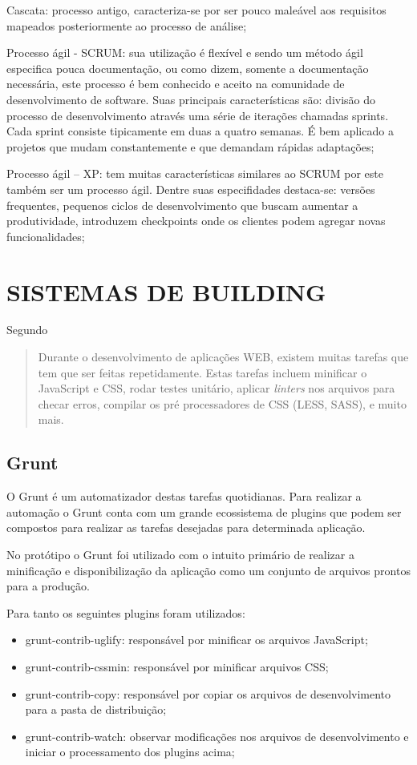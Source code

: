Cascata: processo antigo, caracteriza-se por ser pouco maleável aos
requisitos mapeados posteriormente ao processo de análise;

Processo ágil - SCRUM: sua utilização é flexível e sendo
um método ágil especifica pouca documentação, ou como dizem,
somente a documentação necessária, este processo é bem conhecido e
aceito na comunidade de desenvolvimento de software. Suas principais
características são: divisão do processo de desenvolvimento através
uma série de iterações chamadas sprints. Cada sprint consiste
tipicamente em duas a quatro semanas. É bem aplicado a projetos que
mudam constantemente e que demandam rápidas adaptações;

Processo ágil – XP: tem muitas características similares ao SCRUM
por este também ser um processo ágil. Dentre suas especifidades
destaca-se: versões frequentes, pequenos ciclos de desenvolvimento que
buscam aumentar a produtividade, introduzem checkpoints onde os clientes
podem agregar novas funcionalidades;

\chapter{SISTEMAS DE BUILDING}

Segundo \cite{gruntTutorial}
\begin{quote}
Durante o desenvolvimento de aplicações WEB, existem muitas tarefas
que tem que ser feitas repetidamente. Estas tarefas incluem minificar o
JavaScript e CSS, rodar testes unitário, aplicar \textit{linters} nos arquivos
para checar erros, compilar os pré processadores de CSS (LESS, SASS), e
muito mais.
\end{quote}

\section{Grunt}

O Grunt é um automatizador destas tarefas quotidianas. Para realizar
a automação o Grunt conta com um grande ecossistema de plugins que
podem ser compostos para realizar as tarefas desejadas para determinada
aplicação.

No protótipo o Grunt foi utilizado com o intuito primário de realizar
a minificação e disponibilização da aplicação como um conjunto de
arquivos prontos para a produção.

Para tanto os seguintes plugins foram utilizados:

\begin{itemize}
    \item grunt-contrib-uglify: responsável por minificar os arquivos JavaScript;
    \item grunt-contrib-cssmin: responsável por minificar arquivos CSS;
    \item grunt-contrib-copy: responsável por copiar os arquivos de desenvolvimento para a pasta de distribuição;
    \item grunt-contrib-watch: observar modificações nos arquivos de desenvolvimento e iniciar o processamento dos plugins acima;
\end{itemize}

